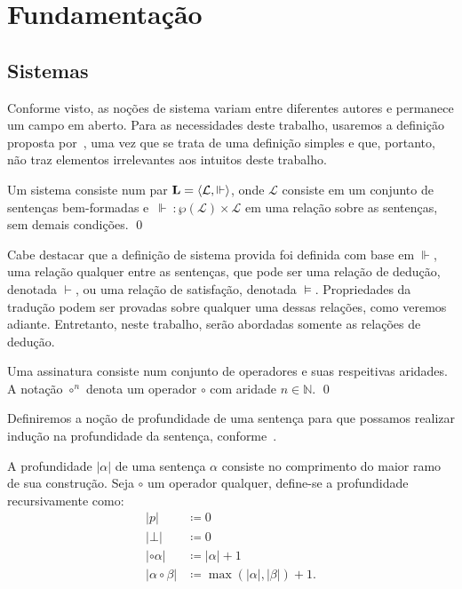 \chapter{Fundamentação}

\section{Sistemas}

Conforme visto, as noções de sistema variam entre diferentes autores e permanece um campo em aberto. Para as necessidades deste trabalho, usaremos a definição proposta por~\cite{Beziau}, uma vez que se trata de uma definição simples e que, portanto, não traz elementos irrelevantes aos intuitos deste trabalho.

\begin{definition}[Sistema]
    Um sistema consiste num par $\mathbf{L} = \langle\mathcal{L}, \Vdash\rangle$, onde $\mathcal{L}$ consiste em um conjunto de sentenças bem-formadas e $\, \Vdash \: : \wp(\mathcal{L}) \times \mathcal{L} $ em uma relação sobre as sentenças, sem demais condições.
    \qed{}
\end{definition}

Cabe destacar que a definição de sistema provida foi definida com base em $\Vdash$, uma relação qualquer entre as sentenças, que pode ser uma relação de dedução, denotada $\vdash$, ou uma relação de satisfação, denotada $\vDash$. Propriedades da tradução podem ser provadas sobre qualquer uma dessas relações, como veremos adiante. Entretanto, neste trabalho, serão abordadas somente as relações de dedução.

\begin{definition}[Assinatura]
    Uma assinatura consiste num conjunto de operadores e suas respeitivas aridades. A notação $\circ^n$ denota um operador $\circ$ com aridade $n \in \mathbb{N}$.
    \qed{}
\end{definition}

Definiremos a noção de profundidade de uma sentença para que possamos realizar indução na profundidade da sentença, conforme~\cite{Troelstra}.

\begin{definition}[Profundidade]
    A profundidade $|\alpha|$ de uma sentença $\alpha$ consiste no comprimento do maior ramo de sua construção. Seja $\circ$ um operador qualquer, define-se a profundidade recursivamente como:
    \begin{align*}
        |p|                  & \coloneqq 0                           \\
        |\bot|               & \coloneqq 0                           \\
        |\circ \alpha|       & \coloneqq |\alpha| + 1                \\
        |\alpha \circ \beta| & \coloneqq \max(|\alpha|, |\beta|) + 1.
        \tag*{\qed} 
    \end{align*}
\end{definition}

